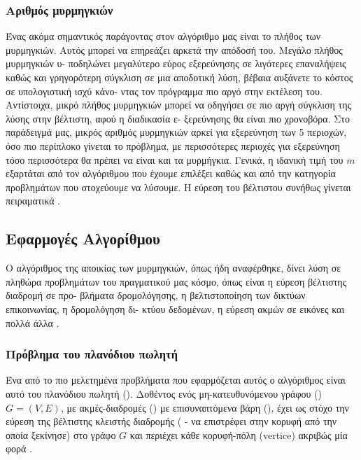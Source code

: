 \subsubsection{Αριθμός μυρμηγκιών}
Ένας ακόμα σημαντικός παράγοντας στον αλγόριθμο μας είναι το πλήθος των μυρμηγκιών. Αυτός μπορεί να επηρεάζει αρκετά την απόδοσή του. Μεγάλο πλήθος μυρμηγκιών υ- ποδηλώνει μεγαλύτερο εύρος εξερεύνησης σε λιγότερες επαναλήψεις καθώς και γρηγορότερη σύγκλιση σε μια αποδοτική λύση, βέβαια αυξάνετε το κόστος σε υπολογιστική ισχύ κάνο- ντας τον πρόγραμμα πιο αργό στην εκτέλεση του. Αντίστοιχα, μικρό πλήθος μυρμηγκιών μπορεί να οδηγήσει σε πιο αργή σύγκλιση της λύσης στην βέλτιστη, αφού η διαδικασία ε- ξερεύνησης θα είναι πιο χρονοβόρα. Στο παράδειγμά μας, μικρός αριθμός μυρμηγκιών αρκεί για εξερεύνηση των 5 περιοχών, όσο πιο περίπλοκο γίνεται το πρόβλημα, με περισσότερες περιοχές για εξερεύνηση τόσο περισσότερα θα πρέπει να είναι και τα μυρμήγκια. Γενικά, η ιδανική τιμή του $m$ εξαρτάται από τον αλγόριθμου  που έχουμε επιλέξει καθώς και από την κατηγορία προβλημάτων που στοχεύουμε να λύσουμε. Η εύρεση του βέλτιστου συνήθως γίνεται πειραματικά \cite{dorigo2003ant}.


\subsection{Εφαρμογές Αλγορίθμου}
Ο αλγόριθμος της αποικίας των μυρμηγκιών, όπως ήδη αναφέρθηκε, δίνει λύση σε πληθώρα προβλημάτων του πραγματικού μας κόσμο, όπως είναι η εύρεση βέλτιστης διαδρομή σε προ- βλήματα δρομολόγησης, η βελτιστοποίηση των δικτύων επικοινωνίας, η δρομολόγηση δι- κτύου δεδομένων, η εύρεση ακμών σε εικόνες και πολλά άλλα \cite{manwlopoulos2014thewria}. 

\subsubsection{Πρόβλημα του πλανόδιου πωλητή}
Ένα από το πιο μελετημένα προβλήματα που εφαρμόζεται αυτός ο αλγόριθμος είναι αυτό του πλανόδιου πωλητή (). Δοθέντος ενός μη-κατευθυνόμενου γράφου () $G=(V,E)$, με ακμές-διαδρομές () με επισυναπτόμενα βάρη (), έχει ως στόχο την εύρεση της βέλτιστης κλειστής διαδρομής ( - να επιστρέφει στην κορυφή από την οποία ξεκίνησε) στο γράφο $G$ και περιέχει κάθε κορυφή-πόλη (vertice) ακριβώς μία φορά \cite{blum2005ant}. 

